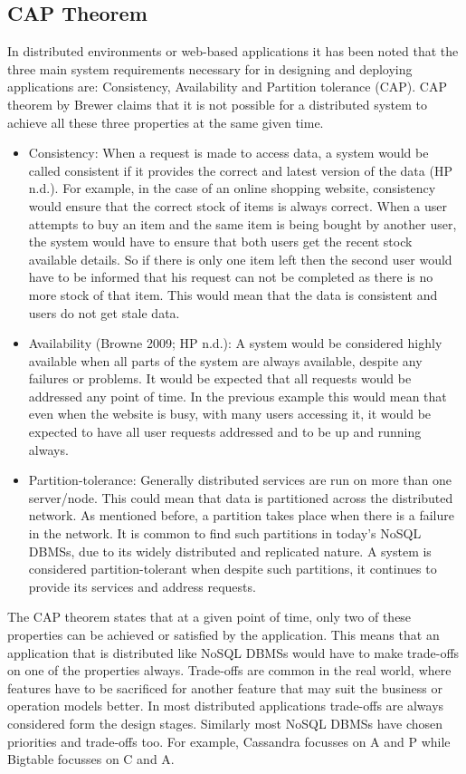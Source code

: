 \subsection{CAP Theorem} \label{ss:cap}
In distributed environments or web-based applications it has been noted that the
three main system requirements necessary for in designing and deploying
applications are: Consistency, Availability and Partition tolerance (CAP). CAP
theorem by Brewer claims that it is not possible for a distributed system to
achieve all these three properties at the same given time.
\begin{itemize}
  \item Consistency: When a request is made to access data, a system would be
  called consistent if it provides the correct and latest version of the data
  (HP n.d.). For example, in the case of an online shopping website, consistency
  would ensure that the correct stock of items is always correct. When a user
  attempts to buy an item and the same item is being bought by another user, the
  system would have to ensure that both users get the recent stock available
  details. So if there is only one item left then the second user would have to
  be informed that his request can not be completed as there is no more stock of
  that item. This would mean that the data is consistent and users do not get
  stale data.
  \item Availability (Browne 2009; HP n.d.): A system would be considered highly
available when all parts of the system are always available, despite any
failures or problems. It would be expected that all requests would be addressed
any point of time. In the previous example this would mean that even when the
website is busy, with many users accessing it, it would be expected to have all
user requests addressed and to be up and running always.
\item Partition-tolerance: Generally distributed services are run on more than one
server/node. This could mean that data is partitioned across the distributed
network. As mentioned before, a partition takes place when there is a failure in
the network. It is common to find such partitions in today’s NoSQL DBMSs, due to
its widely distributed and replicated nature. A system is considered
partition-tolerant when despite such partitions, it continues to provide its
services and address requests.  
\end{itemize}

The CAP theorem states that at a given point of time, only two of these
properties can be achieved or satisfied by the application. This means that an
application that is distributed like NoSQL DBMSs would have to make trade-offs
on one of the properties always. Trade-offs are common in the real world, where
features have to be sacrificed for another feature that may suit the business or
operation models better. In most distributed applications trade-offs are always
considered form the design stages.  Similarly most NoSQL DBMSs have chosen
priorities and trade-offs too. For example, Cassandra focusses on A and P while
Bigtable focusses on C and A.

